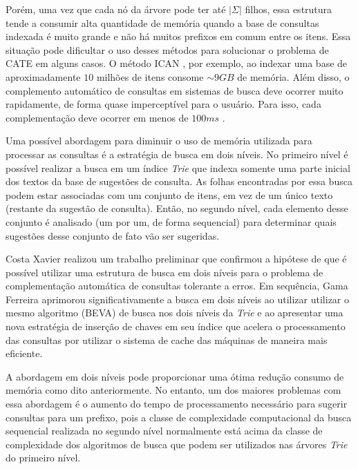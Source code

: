 Porém, uma vez que cada nó da árvore pode ter até $|\Sigma|$ filhos, essa estrutura tende a consumir alta quantidade de memória quando a base de consultas indexada é muito grande e não há muitos prefixos em comum entre os itens. Essa situação pode dificultar o uso desses métodos para solucionar o problema de CATE em alguns casos. O método ICAN \citep{ji2009efficient}, por exemplo, ao indexar uma base de aproximadamente $10$ milhões de itens consome $\sim9GB$ de memória. Além disso, o complemento automático de consultas em sistemas de busca deve ocorrer muito rapidamente, de forma quase imperceptível para o usuário. Para isso, cada complementação deve ocorrer em menos de $100ms$ \citep{ji2009efficient}.

Uma possível abordagem para diminuir o uso de memória utilizada para processar as consultas é a estratégia de busca em dois níveis. No primeiro nível é possível realizar a busca em um índice \textit{Trie} que indexa somente uma parte inicial dos textos da base de sugestões de consulta. As folhas encontradas por essa busca podem estar associadas com um conjunto de itens, em vez de um único texto (restante da sugestão de consulta). Então, no segundo nível, cada elemento desse conjunto é analisado (um por um, de forma sequencial) para determinar quais sugestões desse conjunto de fato vão ser sugeridas. 

Costa Xavier \citep{xavier2019} realizou um trabalho preliminar que confirmou a hipótese de que é possível utilizar uma estrutura de busca em dois níveis para o problema de complementação automática de consultas tolerante a erros. Em sequência, Gama Ferreira \citep{berg2020} aprimorou significativamente a busca em dois níveis ao utilizar utilizar o mesmo algoritmo (BEVA) de busca nos dois níveis da \textit{Trie} e ao apresentar uma nova estratégia de inserção de chaves em seu índice que acelera o processamento das consultas por utilizar o sistema de cache das máquinas de maneira mais eficiente. %

A abordagem em dois níveis pode proporcionar uma ótima redução consumo de memória como dito anteriormente. No entanto, um dos maiores problemas com essa abordagem é o aumento do tempo de processamento necessário para sugerir consultas para um prefixo, pois a classe de complexidade computacional da busca sequencial realizada no segundo nível normalmente está acima da classe de complexidade dos algoritmos de busca que podem ser utilizados nas árvores \textit{Trie} do primeiro nível.

